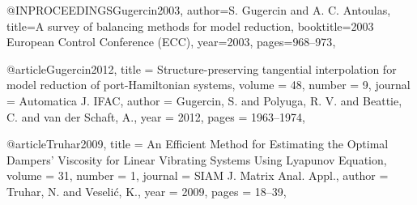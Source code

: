@INPROCEEDINGS{Gugercin2003,
  author={S. {Gugercin} and A. C. {Antoulas}},
  title={A survey of balancing methods for model reduction}, 
  booktitle={2003 European Control Conference (ECC)}, 
  year={2003},
  pages={968--973},
}

@article{Gugercin2012,
	title = {Structure-preserving tangential interpolation for model reduction of port-{Hamiltonian} systems},
	volume = {48},
	number = {9},
	journal = {Automatica J. IFAC},
	author = {Gugercin, S. and Polyuga, R. V. and Beattie, C. and van der Schaft, A.},
	year = {2012},
	pages = {1963--1974},
}

@article{Truhar2009,
	title = {An Efficient Method for Estimating the Optimal Dampers' Viscosity for Linear Vibrating Systems Using {L}yapunov Equation},
	volume = {31},
	number = {1},
	journal = {SIAM J. Matrix Anal. Appl.},
	author = {Truhar, N. and Veseli\'c, K.},
	year = {2009},
	pages = {18--39},
}

